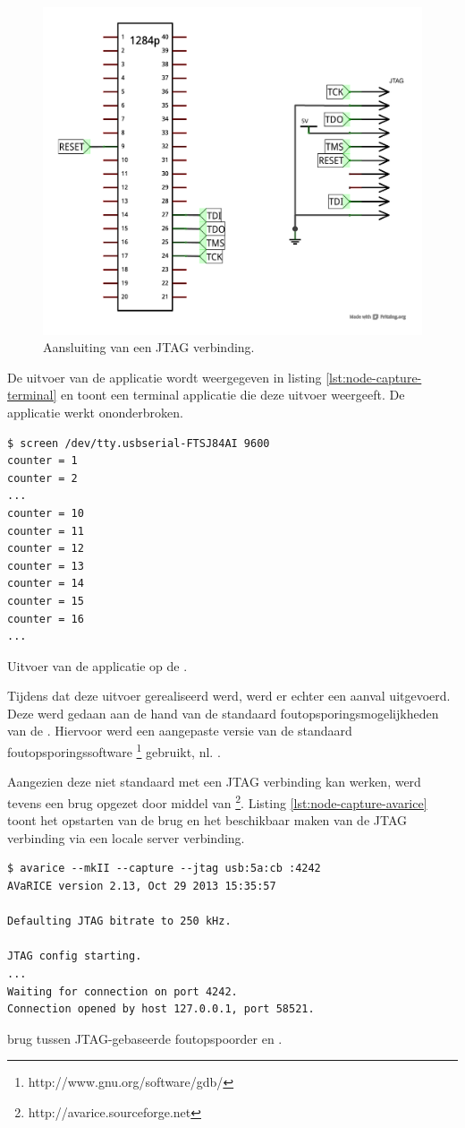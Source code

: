 \begin{figure}[hb]
  \centering
  \includegraphics[width=0.7\linewidth]{resources/node-capture-jtag.pdf}
  \caption{Aansluiting van een JTAG verbinding.}
  \label{fig:node-capture-jtag}
\end{figure}

De uitvoer van de applicatie wordt weergegeven in listing
\ref{lst:node-capture-terminal} en toont een terminal applicatie die deze
uitvoer weergeeft. De applicatie werkt ononderbroken.

\begin{listing}
  \begin{verbatim}
$ screen /dev/tty.usbserial-FTSJ84AI 9600
counter = 1
counter = 2
...
counter = 10
counter = 11
counter = 12
counter = 13
counter = 14
counter = 15
counter = 16
...
\end{verbatim}
  \caption{Uitvoer van de applicatie op de \mcu.}
  \label{lst:node-capture-terminal}
\end{listing}

Tijdens dat deze uitvoer gerealiseerd werd, werd er echter een aanval
uitgevoerd. Deze werd gedaan aan de hand van de standaard
foutopsporingsmogelijkheden van de \mcu. Hiervoor werd een aangepaste versie
van de standaard foutopsporingssoftware
\footnote{http://www.gnu.org/software/gdb/} gebruikt, nl.
.

Aangezien deze niet standaard met een JTAG verbinding kan werken, werd tevens
een brug opgezet door middel van
\footnote{http://avarice.sourceforge.net}. Listing
\ref{lst:node-capture-avarice} toont het opstarten van de brug en het
beschikbaar maken van de JTAG verbinding via een locale server verbinding.

\begin{listing}
  \begin{verbatim}
$ avarice --mkII --capture --jtag usb:5a:cb :4242
AVaRICE version 2.13, Oct 29 2013 15:35:57

Defaulting JTAG bitrate to 250 kHz.

JTAG config starting.
...
Waiting for connection on port 4242.
Connection opened by host 127.0.0.1, port 58521.
  \end{verbatim}
  \caption{ brug tussen JTAG-gebaseerde foutopspoorder en .}
  \label{lst:node-capture-avarice}
\end{listing}

